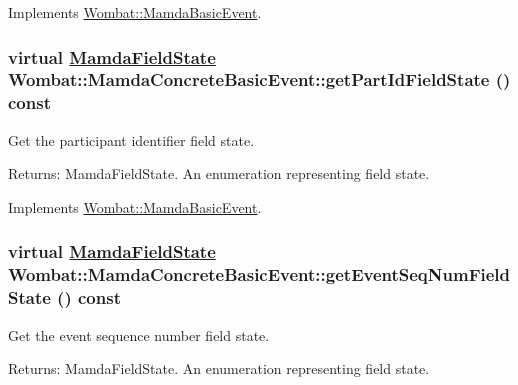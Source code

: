 Implements \hyperlink{classWombat_1_1MamdaBasicEvent_ef95e19f4babb0e5ea8549d6cf29d13f}{Wombat::Mamda\-Basic\-Event}.\hypertarget{classWombat_1_1MamdaConcreteBasicEvent_8e848f2a327a657f8879ae6a53ee896d}{
\subsubsection[getPartIdFieldState]{\setlength{\rightskip}{0pt plus 5cm}virtual \hyperlink{namespaceWombat_93aac974f2ab713554fd12a1fa3b7d2a}{Mamda\-Field\-State} Wombat::Mamda\-Concrete\-Basic\-Event::get\-Part\-Id\-Field\-State () const}}
\label{classWombat_1_1MamdaConcreteBasicEvent_8e848f2a327a657f8879ae6a53ee896d}


Get the participant identifier field state. 

\begin{Desc}
\item[Returns:]Mamda\-Field\-State. An enumeration representing field state. \end{Desc}


Implements \hyperlink{classWombat_1_1MamdaBasicEvent_c361c99af2cf7eb9f5621d89f744fc62}{Wombat::Mamda\-Basic\-Event}.\hypertarget{classWombat_1_1MamdaConcreteBasicEvent_295b7ceae0675c43a374d2b38a41ffd2}{
\subsubsection[getEventSeqNumFieldState]{\setlength{\rightskip}{0pt plus 5cm}virtual \hyperlink{namespaceWombat_93aac974f2ab713554fd12a1fa3b7d2a}{Mamda\-Field\-State} Wombat::Mamda\-Concrete\-Basic\-Event::get\-Event\-Seq\-Num\-Field\-State () const}}
\label{classWombat_1_1MamdaConcreteBasicEvent_295b7ceae0675c43a374d2b38a41ffd2}


Get the event sequence number field state. 

\begin{Desc}
\item[Returns:]Mamda\-Field\-State. An enumeration representing field state. \end{Desc}


